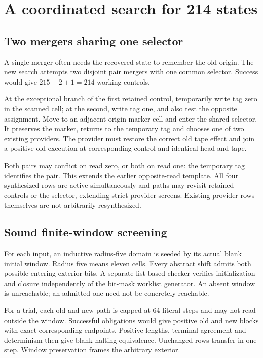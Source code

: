 \documentclass[11pt]{article}
\begin{document}
\section{A coordinated search for 214 states}

\subsection{Two mergers sharing one selector}

A single merger often needs the recovered state to remember the old origin.
The new search attempts two disjoint pair mergers with one common selector.
Success would give $215-2+1=214$ working controls.

At the exceptional branch of the first retained control, temporarily write
tag zero in the scanned cell; at the second, write tag one, and also test the
opposite assignment. Move to an adjacent origin-marker cell and enter the
shared selector. It preserves the marker, returns to the temporary tag and
chooses one of two existing providers. The provider must restore the correct
old tape effect and join a positive old execution at corresponding control
and identical head and tape.

Both pairs may conflict on read zero, or both on read one: the temporary tag
identifies the pair. This extends the earlier opposite-read template. All four
synthesized rows are active simultaneously and paths may revisit retained
controls or the selector, extending strict-provider screens. Existing provider
rows themselves are not arbitrarily resynthesized.

\subsection{Sound finite-window screening}

For each input, an inductive radius-five domain is seeded by its actual blank
initial window. Radius five means eleven cells. Every abstract shift admits
both possible entering exterior bits. A separate list-based checker verifies
initialization and closure independently of the bit-mask worklist generator.
An absent window is unreachable; an admitted one need not be concretely reachable.

For a trial, each old and new path is capped at 64 literal steps and may not
read outside the window. Successful obligations would give positive old and
new blocks with exact corresponding endpoints. Positive lengths, terminal
agreement and determinism then give blank halting equivalence. Unchanged rows
transfer in one step. Window preservation frames the arbitrary exterior.
\end{document}
